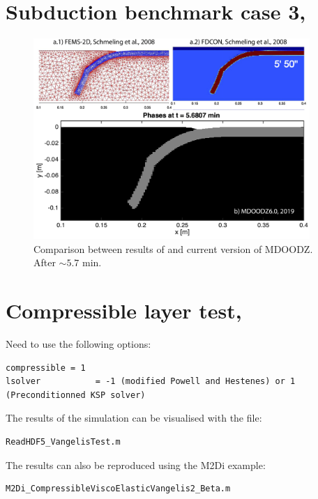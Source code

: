 \documentclass[12pt,english,openany]{scrbook}
\begin{document}
\section{Subduction benchmark case 3, \citet{Schmeling08}}

\begin{figure}[ht!]
\centerline{\includegraphics[height=3.0in]{./Figures/SubBench3_MDOODZ}}
\caption{Comparison between results of \citet{Schmeling08} and current version of MDOODZ. After $\sim5.7$ min.}
\label{SubBench3}
\end{figure}

\section{Compressible layer test, \citet{Moulas18}}

Need to use the following options:
\begin{verbatim} 
compressible = 1
lsolver           = -1 (modified Powell and Hestenes) or 1 (Preconditionned KSP solver)
\end{verbatim}

The results of the simulation can be visualised with the file:
\begin{verbatim} 
ReadHDF5_VangelisTest.m
\end{verbatim}

The results can also be reproduced using the M2Di example:
\begin{verbatim} 
M2Di_CompressibleViscoElasticVangelis2_Beta.m
\end{verbatim}
\end{document}
